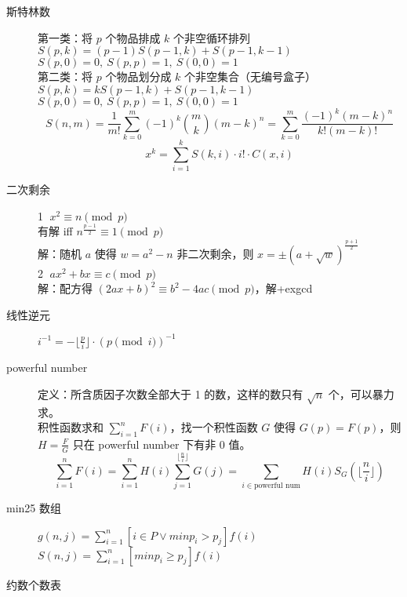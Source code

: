 \documentclass[6pt]{article}
\begin{document}
\begin{multicols}{2}
\begin{description}
    \item[斯特林数] 第一类：将 $p$ 个物品排成 $k$ 个非空循环排列 \\
          $S(p,k) = (p-1)S(p-1,k) + S(p-1,k-1)$ \\
          $S(p,0) = 0, \ S(p,p) = 1, \ S(0,0) = 1$ \\
          第二类：将 $p$ 个物品划分成 $k$ 个非空集合（无编号盒子） \\
          $S(p,k) = kS(p-1,k) + S(p-1,k-1)$ \\
          $S(p,0) = 0,\ S(p,p) = 1,\ S(0,0) = 1$ \\
          $$
            S(n,m) = \frac{1}{m!} \sum_{k=0}^m (-1)^k \binom{m}{k} (m-k)^n = \sum_{k=0}^m \frac{(-1)^k (m-k)^n}{k!(m-k)!}
          $$
          $$
            x^k=\sum_{i=1}^k S(k,i)\cdot i! \cdot C(x,i)
          $$

    \item[二次剩余] \textcircled{1} $x^2 \equiv n \pmod p$ \\
          有解 iff $n^{\frac{p-1}{2}} \equiv 1 \pmod p$ \\
          解：随机 $a$ 使得 $w = a^2 - n$ 非二次剩余，则 $x = \pm (a+ \sqrt w)^{\frac{p+1}{2}}$ \\
          \textcircled{2} $ax^2 + bx \equiv c \pmod p$ \\
          解：配方得 $(2ax+b)^2 \equiv b^2 - 4ac \pmod p$，解+exgcd
    \item[线性逆元] $i^{-1} = - \lfloor \frac{p}{i} \rfloor \cdot (p \pmod i)^{-1}$
    \item[powerful number] 定义：所含质因子次数全部大于 1 的数，这样的数只有 $\sqrt n$ 个，可以暴力求。\\
          积性函数求和 $\sum_{i=1}^n F(i)$，找一个积性函数 $G$ 使得 $G(p) = F(p)$，则 $H = \frac FG$ 只在 powerful number 下有非 0 值。
          $$
            \sum_{i=1}^n F(i) = \sum_{i=1}^n H(i) \sum_{j=1}^{\lfloor \frac ni \rfloor} G(j) = \sum_{i \in \text{powerful num}} H(i) S_G(\lfloor \frac ni \rfloor)
          $$
    \item[min25 数组] $g(n,j) = \sum_{i=1}^n [i \in P \lor minp_i > p_j] f(i)$ \\
          $S(n,j) = \sum_{i=1}^n [minp_i \ge p_j] f(i)$

    \item[约数个数表]


\end{description}
\end{multicols}
\end{document}
